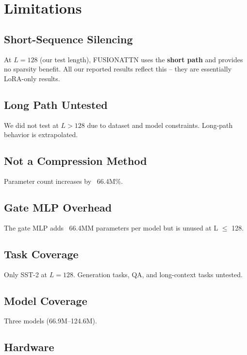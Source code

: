 \section{Limitations}

\subsection{Short-Sequence Silencing}

At $L = 128$ (our test length), FUSIONATTN uses the \textbf{short path} and 
provides no sparsity benefit. All our reported results reflect this -- they 
are essentially LoRA-only results.

\subsection{Long Path Untested}

We did not test at $L > 128$ due to dataset and model constraints. Long-path 
behavior is extrapolated.

\subsection{Not a Compression Method}

Parameter count increases by ~66.4M\%.

\subsection{Gate MLP Overhead}

The gate MLP adds ~66.4MM parameters per model but is unused at 
L $\le$ 128.

\subsection{Task Coverage}

Only SST-2 at $L = 128$. Generation tasks, QA, and long-context tasks 
untested.

\subsection{Model Coverage}

Three models (66.9M--124.6M).

\subsection{Hardware}


